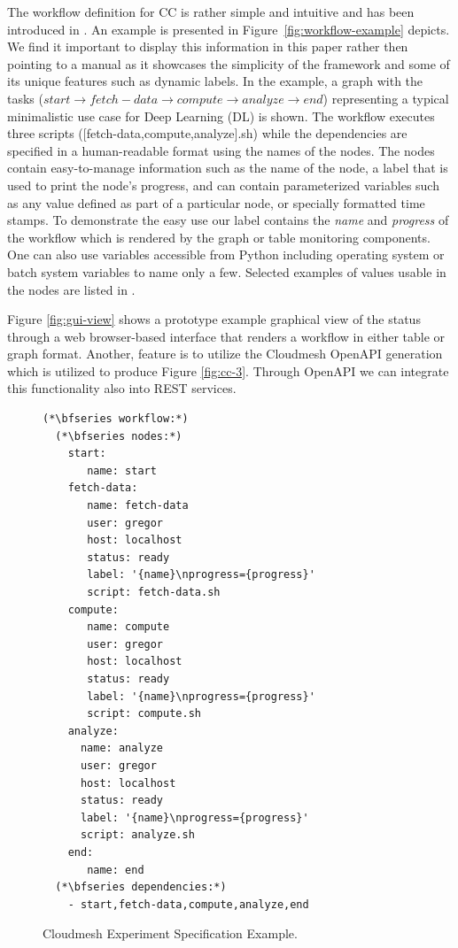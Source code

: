 \documentclass[sigconf]{acmart}
\begin{document}
The workflow definition for CC is rather simple and
intuitive and has been introduced in \cite{las-2022-templated}. An example is presented in  Figure~\ref{fig:workflow-example} depicts. We find it important to display this information in this paper rather then pointing to a manual as it showcases the simplicity of the framework and some of its unique features such as dynamic labels. In the example, a graph
with the tasks ($start \rightarrow f\!etch\!-\!data
\rightarrow compute \rightarrow analyze \rightarrow end$) representing a typical minimalistic use case for Deep Learning (DL) is shown. The workflow
 executes three scripts ([fetch-data,compute,analyze].sh) while the dependencies are specified in a human-readable format using the names of the nodes. The nodes contain easy-to-manage information such as the name of the node, a label that is used to print the node's progress, and can contain parameterized variables such as any value defined as part of a particular node, or specially formatted time stamps. To demonstrate the easy use our label contains the {\em name} and {\em progress} of the workflow which is rendered by the graph or table monitoring components. One can also use variables accessible from Python including operating system or batch system variables to name only a few. Selected examples of values usable in the nodes are listed in \citep{las-2022-templated}.
 
Figure \ref{fig:gui-view} shows a prototype  example graphical view of the status through a  web browser-based interface that renders a workflow in either table or graph format. Another, feature is to utilize the Cloudmesh OpenAPI generation which is utilized to produce 
Figure \ref{fig:cc-3}. Through OpenAPI we can integrate this functionality also into REST services.


\begin{figure}[htb]
\vspace{-0.4cm} 
\begin{lstlisting}[breaklines=true,basicstyle=\small]
(*\bfseries workflow:*)
  (*\bfseries nodes:*)
    start:
       name: start
    fetch-data:
       name: fetch-data
       user: gregor
       host: localhost
       status: ready
       label: '{name}\nprogress={progress}'
       script: fetch-data.sh
    compute:
       name: compute
       user: gregor
       host: localhost
       status: ready
       label: '{name}\nprogress={progress}'
       script: compute.sh
    analyze:
      name: analyze
      user: gregor
      host: localhost
      status: ready
      label: '{name}\nprogress={progress}'
      script: analyze.sh
    end:
       name: end
  (*\bfseries dependencies:*)
    - start,fetch-data,compute,analyze,end
\end{lstlisting}
\vspace{-0.4cm}
\caption{Cloudmesh Experiment Specification Example.}\label{fig:workflow-example}
\label{fig:yaml-file}
\end{figure}
\end{document}
